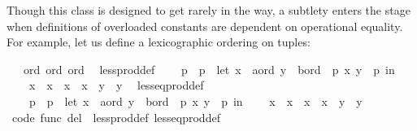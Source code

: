 \begin{isabellebody}
\begin{isamarkuptext}
  Though this  class is designed to get rarely in
  the way, a subtlety
  enters the stage when definitions of overloaded constants
  are dependent on operational equality.  For example, let
  us define a lexicographic ordering on tuples:%
\end{isamarkuptext}%
\isamarkuptrue%
%
\isadelimML
%
\endisadelimML
%
\isatagML
%
\endisatagML
{\isafoldML}%
%
\isadelimML
%
\endisadelimML
{}\isamarkupfalse%
\ {\isacharasterisk}\ {\isacharcolon}{\isacharcolon}\ {\isacharparenleft}ord{\isacharcomma}\ ord{\isacharparenright}\ ord\isanewline
\ \ less{\isacharunderscore}prod{\isacharunderscore}def{\isacharcolon}\isanewline
\ \ \ \ {\isachardoublequoteopen}p{}\ {\isacharless}\ p{}\ {\isasymequiv}\ let\ {\isacharparenleft}x{}\ {\isasymColon}\ {\isacharprime}a{\isasymColon}ord{\isacharcomma}\ y{}\ {\isasymColon}\ {\isacharprime}b{\isasymColon}ord{\isacharparenright}\ {\isacharequal}\ p{}{\isacharsemicolon}\ {\isacharparenleft}x{}{\isacharcomma}\ y{}{\isacharparenright}\ {\isacharequal}\ p{}\ in\isanewline
\ \ \ \ x{}\ {\isacharless}\ x{}\ {\isasymor}\ {\isacharparenleft}x{}\ {\isacharequal}\ x{}\ {\isasymand}\ y{}\ {\isacharless}\ y{}{\isacharparenright}{\isachardoublequoteclose}\isanewline
\ \ less{\isacharunderscore}eq{\isacharunderscore}prod{\isacharunderscore}def{\isacharcolon}\isanewline
\ \ \ \ {\isachardoublequoteopen}p{}\ {\isasymle}\ p{}\ {\isasymequiv}\ let\ {\isacharparenleft}x{}\ {\isasymColon}\ {\isacharprime}a{\isasymColon}ord{\isacharcomma}\ y{}\ {\isasymColon}\ {\isacharprime}b{\isasymColon}ord{\isacharparenright}\ {\isacharequal}\ p{}{\isacharsemicolon}\ {\isacharparenleft}x{}{\isacharcomma}\ y{}{\isacharparenright}\ {\isacharequal}\ p{}\ in\isanewline
\ \ \ \ x{}\ {\isacharless}\ x{}\ {\isasymor}\ {\isacharparenleft}x{}\ {\isacharequal}\ x{}\ {\isasymand}\ y{}\ {\isasymle}\ y{}{\isacharparenright}{\isachardoublequoteclose}%
\isadelimproof
\ %
\endisadelimproof
%
\isatagproof
\isacommand{{\isachardot}{\isachardot}}\isamarkupfalse%
%
\endisatagproof
{\isafoldproof}%
%
\isadelimproof
%
\endisadelimproof
\isanewline
\isanewline
{}\isamarkupfalse%
\ {\isacharbrackleft}code\ func\ del{\isacharbrackright}\ {\isacharequal}\ less{\isacharunderscore}prod{\isacharunderscore}def\ less{\isacharunderscore}eq{\isacharunderscore}prod{\isacharunderscore}def\isanewline

\end{isabellebody}
